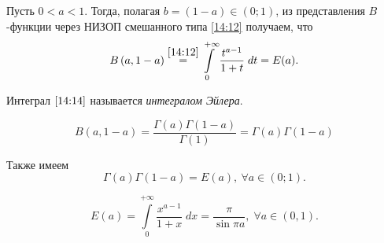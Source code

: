 \documentclass[../../main.tex]{subfiles}
\begin{document}
	Пусть $0 < a < 1$. Тогда, полагая $b = (1-a) \in (0;1)$, из представления 
	$B$-функции через НИЗОП смешанного типа \eqref{14:12} получаем, что
	\begin{equation}
	\label{14:14}
	B\left( a,1-a\right) \stk{14:12}= \int\limits_{0}^{+\infty} 
	\frac{t^{a-1}}{1+t} \; dt = 
	E(a).
	\end{equation}
	
	Интеграл $\eqref{14:14}$ называется \emph{интегралом Эйлера}.
	
	\[  B\left( a,1-a\right)  = \frac{\Gamma(a) \Gamma(1-a) }{\Gamma(1)} = 
	\Gamma(a) \Gamma(1-a) \]
	
	Также имеем
	\begin{equation}
	\label{14:15}
	\Gamma(a) \Gamma(1-a) = E(a),\ \forall a \in (0;1).
	\end{equation}
	
	\begin{thm}
		\begin{equation}
		\label{14:16}
		E(a) = \int\limits_{0}^{+\infty} \frac{x^{a-1}}{1+x} \; dx = 
		\frac{\pi}{\sin{\pi a}}, \; \forall a \in(0,1).
		\end{equation}
	\end{thm}
\end{document}
